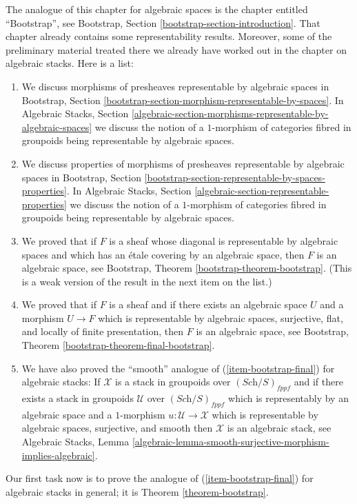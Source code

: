\noindent
The analogue of this chapter for algebraic spaces is the chapter entitled
``Bootstrap'', see
Bootstrap, Section \ref{bootstrap-section-introduction}.
That chapter already contains some representability results.
Moreover, some of the preliminary material treated there we already
have worked out in the chapter on algebraic stacks.
Here is a list:
\begin{enumerate}
\item We discuss morphisms of presheaves representable by algebraic spaces in
Bootstrap, Section
\ref{bootstrap-section-morphism-representable-by-spaces}.
In
Algebraic Stacks, Section
\ref{algebraic-section-morphisms-representable-by-algebraic-spaces}
we discuss the notion of a $1$-morphism of categories fibred in groupoids
being representable by algebraic spaces.
\item We discuss properties of morphisms of presheaves representable by
algebraic spaces in
Bootstrap, Section
\ref{bootstrap-section-representable-by-spaces-properties}.
In
Algebraic Stacks, Section
\ref{algebraic-section-representable-properties}
we discuss the notion of a $1$-morphism of categories fibred in groupoids
being representable by algebraic spaces.
\item We proved that if $F$ is a sheaf whose diagonal is representable
by algebraic spaces and which has an \'etale covering by an algebraic
space, then $F$ is an algebraic space, see
Bootstrap, Theorem \ref{bootstrap-theorem-bootstrap}.
(This is a weak version of the result in the next item on the list.)
\item
\label{item-bootstrap-final}
We proved that if $F$ is a sheaf and if there exists an algebraic
space $U$ and a morphism $U \to F$ which is representable by algebraic
spaces, surjective, flat, and locally of finite presentation, then
$F$ is an algebraic space, see
Bootstrap, Theorem \ref{bootstrap-theorem-final-bootstrap}.
\item We have also proved the ``smooth'' analogue of
(\ref{item-bootstrap-final}) for algebraic
stacks: If $\mathcal{X}$ is a stack in groupoids over
$(\textit{Sch}/S)_{fppf}$ and if there exists a stack in groupoids
$\mathcal{U}$ over $(\textit{Sch}/S)_{fppf}$ which is representably
by an algebraic space and a $1$-morphism $u : \mathcal{U} \to \mathcal{X}$
which is representable by algebraic spaces, surjective, and smooth
then $\mathcal{X}$ is an algebraic stack, see
Algebraic Stacks, Lemma
\ref{algebraic-lemma-smooth-surjective-morphism-implies-algebraic}.
\end{enumerate}
Our first task now is to prove the analogue of
(\ref{item-bootstrap-final}) for algebraic
stacks in general; it is
Theorem \ref{theorem-bootstrap}.



